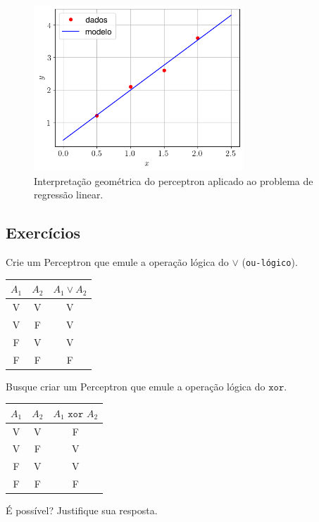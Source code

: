 \begin{figure}[H]
  \centering
  \includegraphics[width=0.7\textwidth]{./cap_perceptron/dados/fig_percep_mq/main}
  \caption{Interpretação geométrica do perceptron aplicado ao problema de regressão linear.}
  \label{fig:percep_mq}
\end{figure}

\subsection{Exercícios}

\begin{exer}
  Crie um Perceptron que emule a operação lógica do $\lor$ (\texttt{ou-lógico}).
  \begin{center}
    \begin{tabular}{cc|c}
      $A_1$ & $A_2$ & $A_1\lor A_2$\\\hline
      V & V & V\\
      V & F & V\\
      F & V & V\\
      F & F & F\\\hline
    \end{tabular}
  \end{center}
\end{exer}

\begin{exer}
  Busque criar um Perceptron que emule a operação lógica do $\texttt{xor}$.
  \begin{center}
    \begin{tabular}{cc|c}
      $A_1$ & $A_2$ & $A_1\texttt{ xor }A_2$\\\hline
      V & V & F\\
      V & F & V\\
      F & V & V\\
      F & F & F\\\hline
    \end{tabular}
  \end{center}
  É possível? Justifique sua resposta.
\end{exer}


